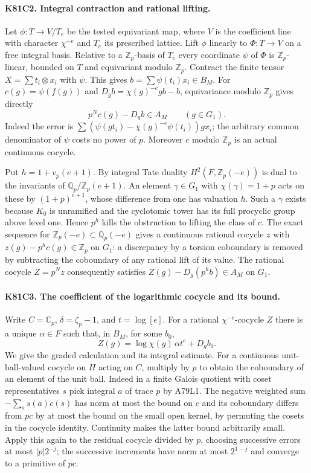 \paragraph{K81C2. Integral contraction and rational lifting.}
Let $\phi:T\to V/T_e$ be the tested equivariant map, where
$V$ is the coefficient line with character $\chi^{-e}$ and $T_e$
its prescribed lattice. Lift $\phi$ linearly to $\Phi:T\to V$
on a free integral basis. Relative to a $\mathbb Z_p$-basis of
$T_e$ every coordinate $\psi$ of $\Phi$ is $\mathbb Z_p$-linear,
bounded on $T$ and equivariant modulo $\mathbb Z_p$. Contract the
finite tensor $X=\sum t_i\otimes x_i$ with $\psi$. This gives
$b=\sum\psi(t_i)x_i\in B_M$. For $c(g)=\psi(f(g))$ and
$D_g b=\chi(g)^{-e}g b-b$, equivariance modulo $\mathbb Z_p$
gives directly
\[
                 p^N c(g)-D_g b\in A_M\qquad(g\in G_1).
\]
Indeed the error is $\sum(\psi(gt_i)-\chi(g)^{-e}\psi(t_i))gx_i$;
the arbitrary common denominator of $\psi$ costs no power of $p$.
Moreover $c$ modulo $\mathbb Z_p$ is an actual continuous cocycle.

Put $h=1+v_p(e+1)$. By integral Tate duality
$H^2(F,\mathbb Z_p(-e))$ is dual to the invariants of
$\mathbb Q_p/\mathbb Z_p(e+1)$. An element $\gamma\in G_1$
with $\chi(\gamma)=1+p$ acts on these by $(1+p)^{e+1}$, whose
difference from one has valuation $h$. Such a $\gamma$ exists
because $K_0$ is unramified and the cyclotomic tower has its full
procyclic group above level one. Hence $p^h$ kills the obstruction
to lifting the class of $c$. The exact sequence for
$\mathbb Z_p(-e)\subset\mathbb Q_p(-e)$ gives a continuous rational
cocycle $z$ with $z(g)-p^h c(g)\in\mathbb Z_p$ on $G_1$:
a discrepancy by a torsion coboundary is removed by subtracting
the coboundary of any rational lift of its value. The rational
cocycle $Z=p^N z$ consequently satisfies
$Z(g)-D_g(p^hb)\in A_M$ on $G_1$.

\paragraph{K81C3. The coefficient of the logarithmic cocycle and its bound.}
Write $C=\mathbb C_p$, $\delta=\zeta_p-1$, and $t=\log[\epsilon]$.
For a rational $\chi^{-e}$-cocycle $Z$ there is a unique
$\alpha\in F$ such that, in $B_M$, for some $b_0$,
\[
 Z(g)=\log\chi(g)\,\alpha t^e+D_g b_0 .
\]
We give the graded calculation and its integral estimate. For a
continuous unit-ball-valued cocycle on $H$ acting on $C$, multiply
by $p$ to obtain the coboundary of an element of the unit ball.
Indeed in a finite Galois quotient with coset representatives $s$
pick integral $a$ of trace $p$ by A79L1. The negative weighted sum
$-\sum_s s(a)c(s)$ has norm at most the bound on $c$ and its
coboundary differs from $pc$ by at most the bound on the small
open kernel, by permuting the cosets in the cocycle identity.
Continuity makes the latter bound arbitrarily small. Apply this
again to the residual cocycle divided by $p$, choosing successive
errors at most $|p|2^{-j}$; the successive increments have norm
at most $2^{1-j}$ and converge to a primitive of $pc$.

